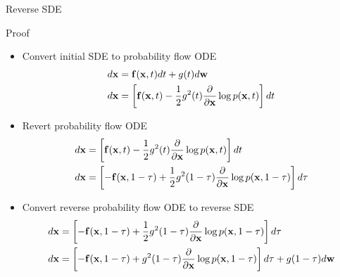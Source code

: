 \begin{frame}{Reverse SDE}
	\begin{block}{Proof}
		\begin{itemize}
			\item Convert initial SDE to probability flow ODE
			\vspace{-0.1cm}
			{\footnotesize
			\begin{align*}
				d\mathbf{x} &= \mathbf{f}(\mathbf{x}, t) dt + g(t) d \mathbf{w} \\
				d\mathbf{x} &= \left[\mathbf{f}(\mathbf{x}, t) -\frac{1}{2} g^2(t) \frac{\partial}{\partial \mathbf{x}} \log p(\mathbf{x}, t) \right] dt
			\end{align*}
			}
			\item Revert probability flow ODE
			\vspace{-0.1cm}
			{\footnotesize
			\begin{align*}
				d\mathbf{x} &= \left[\mathbf{f}(\mathbf{x}, t) -\frac{1}{2} g^2(t) \frac{\partial}{\partial \mathbf{x}} \log p(\mathbf{x}, t) \right] dt \\
				d\mathbf{x} &= \left[- \mathbf{f}(\mathbf{x}, 1 - \tau) + \frac{1}{2} g^2(1 - \tau) \frac{\partial}{\partial \mathbf{x}} \log p(\mathbf{x}, 1 - \tau) \right] d \tau
			\end{align*}
			}
			\item Convert reverse probability flow ODE to reverse SDE
			\vspace{-0.1cm}
			{\footnotesize
			\begin{align*}
				d\mathbf{x} &= \left[- \mathbf{f}(\mathbf{x}, 1 - \tau) + \frac{1}{2} g^2(1 - \tau) \frac{\partial}{\partial \mathbf{x}} \log p(\mathbf{x}, 1 - \tau) \right] d \tau \\
				d\mathbf{x} &= \left[- \mathbf{f}(\mathbf{x}, 1 - \tau) + g^2(1 - \tau) \frac{\partial}{\partial \mathbf{x}} \log p(\mathbf{x}, 1 - \tau) \right] d\tau + g(1 - \tau) d \mathbf{w}
			\end{align*}
			}
		\end{itemize}
	\end{block}
\end{frame}
